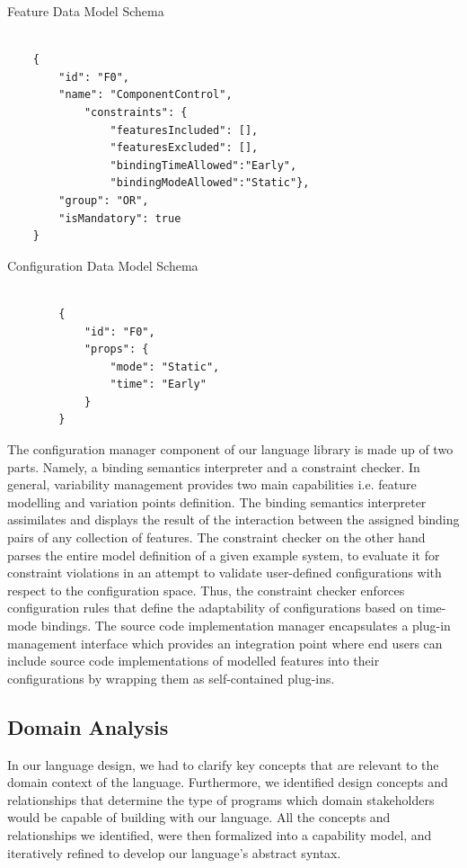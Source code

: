 \documentclass[conference]{IEEEtran}
\begin{document}
\begin{listing}[H]
\caption{Feature Data Model Schema}
\begin{verbatim}

    {
        "id": "F0",
        "name": "ComponentControl",
            "constraints": {
	            "featuresIncluded": [],
	            "featuresExcluded": [],
	            "bindingTimeAllowed":"Early",
	            "bindingModeAllowed":"Static"},
        "group": "OR",
        "isMandatory": true
    }

\end{verbatim}
\label{feat-schema}
\end{listing}

\begin{listing}[H]
\caption{Configuration Data Model Schema}
\begin{verbatim}

		{
		    "id": "F0",
		    "props": {
		        "mode": "Static",
		        "time": "Early"
		    }
		}
\end{verbatim}
\label{bind-schema}
\end{listing}

The configuration manager component of our language library is made up of two parts. Namely, a binding semantics interpreter and a constraint checker. In general, variability management provides two main capabilities i.e. feature modelling and variation points definition. The binding semantics interpreter assimilates and displays the result of the interaction between the assigned binding pairs of any collection of features. The constraint checker on the other hand parses the entire model definition of a given example system, to evaluate it for constraint violations in an attempt to validate user-defined configurations with respect to the configuration space. Thus, the constraint checker enforces configuration rules that define the adaptability of configurations based on time-mode bindings.
The source code implementation manager encapsulates a plug-in management interface which provides an integration point where end users can include source code implementations of modelled features into their configurations by wrapping them as self-contained plug-ins.

\subsection{Domain Analysis}
In our language design, we had to clarify key concepts that are relevant to the domain context of the language. Furthermore, we identified design concepts and relationships that determine the type of programs which domain stakeholders would be capable of building with our language. All the concepts and relationships we identified, were then formalized into a capability model, and iteratively refined to develop our language's abstract syntax.
\end{document}
